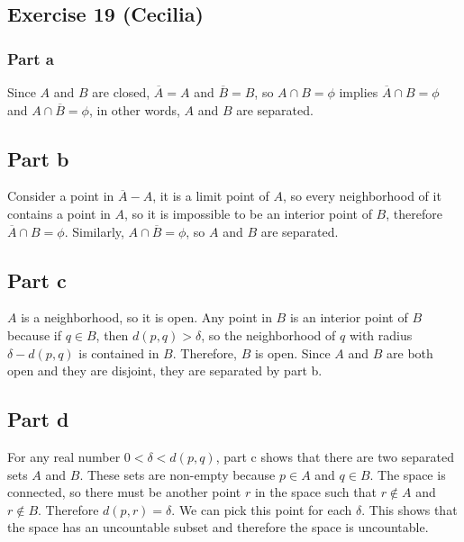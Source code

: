 \subsection*{Exercise 19 (Cecilia)}
\subsubsection*{Part a}
Since $ A $ and $ B $ are closed, $ \overline{A} = A $ and $ \overline{B} = B $, so $ A \cap B = \phi $ implies $ \overline{A} \cap B = \phi $ and $ A \cap \overline{B} = \phi $, in other words, $ A $ and $ B $ are separated.
\subsection*{Part b}
Consider a point in $ \overline{A} - A $, it is a limit point of $ A $, so every neighborhood of it contains a point in $ A $, so it is impossible to be an interior point of $ B $, therefore $ \overline{A} \cap B = \phi $. Similarly, $ A \cap \overline{B} = \phi $, so $ A $ and $ B $ are separated.
\subsection*{Part c}
$ A $ is a neighborhood, so it is open. Any point in $ B $ is an interior point of $ B $ because if $ q \in B $, then $ d(p, q) > \delta $, so the neighborhood of $ q $ with radius $ \delta - d(p, q) $ is contained in $ B $. Therefore, $ B $ is open. Since $ A $ and $ B $ are both open and they are disjoint, they are separated by part b.
\subsection*{Part d}
For any real number $ 0 < \delta < d(p, q) $, part c shows that there are two separated sets $ A $ and $ B $. These sets are non-empty because $ p \in A $ and $ q \in B $. The space is connected, so there must be another point $ r $ in the space such that $ r \notin A $ and $ r \notin B $. Therefore $ d(p, r) = \delta $. We can pick this point for each $ \delta $.
This shows that the space has an uncountable subset and therefore the space is uncountable.
